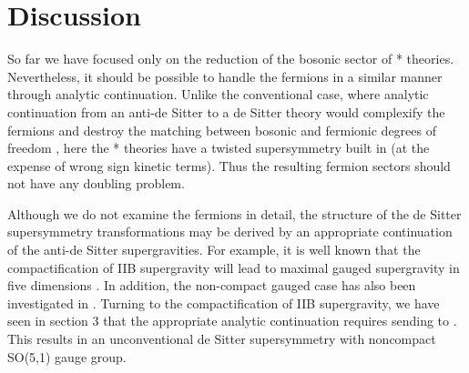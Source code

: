 \documentclass[a4paper,12pt]{article}
\begin{document}
\section{Discussion}

So far we have focused only on the reduction of the bosonic sector of *
theories.  Nevertheless, it should be possible to handle the fermions in a
similar manner through analytic continuation.  Unlike the conventional case,
where analytic continuation from an anti-de Sitter to a de Sitter theory would
complexify the fermions and destroy the matching between bosonic and
fermionic degrees of freedom \cite{Pilch}, here the * theories have a twisted
supersymmetry built in (at the expense of wrong sign kinetic terms).  Thus
the resulting fermion sectors should not have any doubling problem.

Although we do not examine the fermions in detail, the structure of the
de Sitter supersymmetry transformations may be derived by an appropriate
continuation of the anti-de Sitter supergravities.  For example, it is well
known that the \coordHE{} compactification of IIB supergravity will lead to
maximal \coordHE{} gauged supergravity in five dimensions
\cite{Gunaydin:1984qu,Pernici:ju,Gunaydin}.  In addition, the
non-compact \coordHE{} gauged case has also been investigated in
\cite{Gunaydin}.  Turning to the \coordHE{} compactification of IIB\myHighlight{$^*$}\coordHE{}
supergravity, we have seen in section 3 that the appropriate analytic
continuation requires sending \coordHE{} to \coordHE{}.  This results in an
unconventional de Sitter supersymmetry with noncompact SO(5,1) gauge group.
\end{document}
